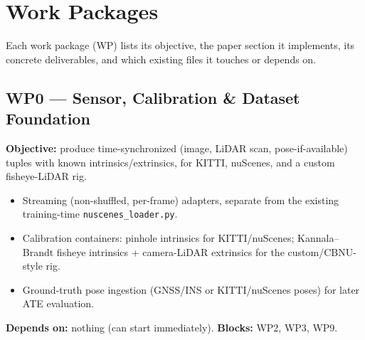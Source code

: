 \documentclass[11pt]{article}
\begin{document}
\section{Work Packages}
\label{sec:wps}

Each work package (WP) lists its objective, the paper section it implements, its concrete deliverables, and which existing files it touches or depends on.

\subsection*{WP0 --- Sensor, Calibration \& Dataset Foundation}
\textbf{Objective:} produce time-synchronized (image, LiDAR scan, pose-if-available) tuples with known intrinsics/extrinsics, for KITTI, nuScenes, and a custom fisheye-LiDAR rig.
\begin{itemize}[nosep]
  \item Streaming (non-shuffled, per-frame) adapters, separate from the existing training-time \texttt{nuscenes\_loader.py}.
  \item Calibration containers: pinhole intrinsics for KITTI/nuScenes; Kannala--Brandt fisheye intrinsics \cite{kannala2006generic} + camera-LiDAR extrinsics for the custom/CBNU-style rig.
  \item Ground-truth pose ingestion (GNSS/INS or KITTI/nuScenes poses) for later ATE evaluation.
\end{itemize}
\textbf{Depends on:} nothing (can start immediately). \textbf{Blocks:} WP2, WP3, WP9.
\end{document}
